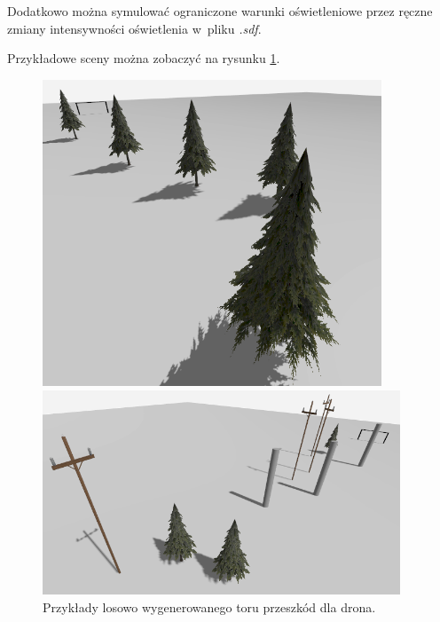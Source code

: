 Dodatkowo można symulować ograniczone warunki oświetleniowe przez ręczne zmiany intensywności oświetlenia w~pliku \textit{.sdf}. 

Przykładowe sceny można zobaczyć na rysunku \ref{fig:sceny}.


\begin{figure}
    \centering
    \begin{minipage}{0.4\textwidth}
        \centering
        \includegraphics[width = 0.9\textwidth]{images/Track1.png}
    \end{minipage}\hfill
    \begin{minipage}{0.6\textwidth}
        \centering
        \includegraphics[width = 0.95\textwidth]{images/Track2.png}
    \end{minipage}
    \caption{Przykłady losowo wygenerowanego toru przeszkód dla drona.}
    \label{fig:sceny}
\end{figure}

